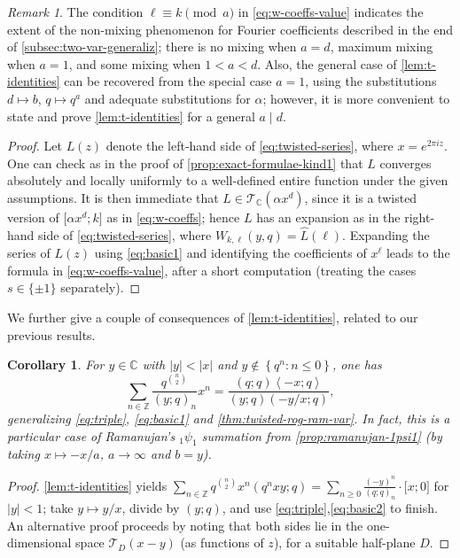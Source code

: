 \documentclass[reqno,11pt]{amsart}
\newtheorem{corollary}[theorem]{Corollary}
\theoremstyle{definition}
\theoremstyle{remark}
\newtheorem*{remark}{Remark}
\numberwithin{equation}{section}
\newcommand{\Z}{\mathbb{Z}}
\newcommand{\C}{\mathbb{C}}
\newcommand{\mT}{\mathcal{T}}
\newcommand{\la}{\left\langle}
\newcommand{\ra}{\right\rangle}
\newcommand{\vect}[2]{\big[{#1};{#2}\big]}
\renewcommand{\hat}{\widehat}
\begin{document}
\begin{remark}
The condition $\ell \equiv k \pmod{a}$ in \cref{eq:w-coeffs-value} indicates the extent of the non-mixing phenomenon for Fourier coefficients described in the end of \cref{subsec:two-var-generaliz}; there is no mixing when $a = d$, maximum mixing when $a = 1$, and some mixing when $1 < a < d$. Also, the general case of \cref{lem:t-identities} can be recovered from the special case $a = 1$, using the substitutions $d \mapsto b$, $q \mapsto q^a$ and adequate substitutions for $\alpha$; however, it is more convenient to state and prove \cref{lem:t-identities} for a general $a \mid d$.
\end{remark}

\begin{proof}
Let $L(z)$ denote the left-hand side of \cref{eq:twisted-series}, where $x = e^{2\pi i z}$. One can check as in the proof of \cref{prop:exact-formulae-kind1} that $L$ converges absolutely and locally uniformly to a well-defined entire function under the given assumptions. It is then immediate that $L \in \mT_\C\left(\alpha x^d \right)$, since it is a twisted version of $\vect{\alpha x^d}{k}$ as in \cref{eq:w-coeffs}; hence $L$ has an expansion as in the right-hand side of \cref{eq:twisted-series}, where $W_{k,\ell}(y, q) = \hat{L}(\ell)$. Expanding the series of $L(z)$ using \cref{eq:basic1} and identifying the coefficients of $x^\ell$ leads to the formula in \cref{eq:w-coeffs-value}, after a short computation (treating the cases $s \in \{\pm 1\}$ separately).
\end{proof}

We further give a couple of consequences of \cref{lem:t-identities}, related to our previous results.
\begin{corollary} \label{cor:d=1} For $y \in \C$ with $|y| < |x|$ and $y \not\in \left\{q^n : n \le 0\right\}$, one has
\[
    \sum_{n \in \Z}
    \frac{q^{\binom{n}{2}}}{\left(y; q \right)_n} x^n 
    =
    \frac{(q; q)\la -x; q \ra}{(y; q)(-y/x; q)},
\]
generalizing \cref{eq:triple}, \cref{eq:basic1} and \cref{thm:twisted-rog-ram-var}. In fact, this is a particular case of Ramanujan's $_1\psi_1$ summation from \cref{prop:ramanujan-1psi1} (by taking $x \mapsto -x/a$, $a \to \infty$ and $b = y$).
\end{corollary}
\begin{proof}
\cref{lem:t-identities} yields $\sum_{n \in \Z} q^{\binom{n}{2}}x^n \left(q^n xy; q\right) = \sum_{n \ge 0} \frac{(-y)^n}{(q; q)_n} \cdot \vect{x}{0}$ for $|y| < 1$; take $y \mapsto y/x$, divide by $(y; q)$, and use \cref{eq:triple},\cref{eq:basic2} to finish. An alternative proof proceeds by noting that both sides lie in the one-dimensional space $\mT_D\left(x - y\right)$ (as functions of $z$), for a suitable half-plane $D$.
\end{proof}
\end{document}
